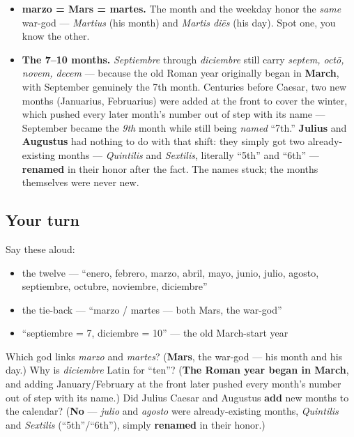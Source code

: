 \begin{cousinweb}
\begin{itemize}
\raggedright
  \item \textbf{marzo = Mars = martes.} The month and the weekday honor the \emph{same} war-god — \emph{Martius} (his month) and \emph{Martis diēs} (his day). Spot one, you know the other.
  \item \textbf{The 7–10 months.} \emph{Septiembre} through \emph{diciembre} still carry \emph{septem, octō, novem, decem} — because the old Roman year originally began in \textbf{March}, with September genuinely the 7th month. Centuries before Caesar, two new months (Januarius, Februarius) were added at the front to cover the winter, which pushed every later month's number out of step with its name — September became the \emph{9th} month while still being \emph{named} \textquotedblleft{}7th.\textquotedblright{} \textbf{Julius} and \textbf{Augustus} had nothing to do with that shift: they simply got two already-existing months — \emph{Quintilis} and \emph{Sextilis}, literally \textquotedblleft{}5th\textquotedblright{} and \textquotedblleft{}6th\textquotedblright{} — \textbf{renamed} in their honor after the fact. The names stuck; the months themselves were never new.
\end{itemize}
\end{cousinweb}

\subsection*{Your turn}
Say these aloud:

\begin{itemize}
\raggedright
  \item the twelve — \textquotedblleft{}enero, febrero, marzo, abril, mayo, junio, julio, agosto, septiembre, octubre, noviembre, diciembre\textquotedblright{}
  \item the tie-back — \textquotedblleft{}marzo / martes — both Mars, the war-god\textquotedblright{}
  \item \textquotedblleft{}septiembre = 7, diciembre = 10\textquotedblright{} — the old March-start year
\end{itemize}

\begin{tcolorbox}[breakable,colback=teal!4,colframe=teal!35!black,title={Before you move on}]
Which god links \emph{marzo} and \emph{martes}? (\textbf{Mars}, the war-god — his month and his day.) Why is \emph{diciembre} Latin for \textquotedblleft{}ten\textquotedblright{}? (\textbf{The Roman year began in March}, and adding January/February at the front later pushed every month's number out of step with its name.) Did Julius Caesar and Augustus \textbf{add} new months to the calendar? (\textbf{No} — \emph{julio} and \emph{agosto} were already-existing months, \emph{Quintilis} and \emph{Sextilis} (\textquotedblleft{}5th\textquotedblright{}/\textquotedblleft{}6th\textquotedblright{}), simply \textbf{renamed} in their honor.)
\end{tcolorbox}
